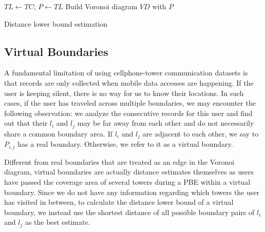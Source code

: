 \begin{algorithm}
 $TL \leftarrow TC$; $P \leftarrow TL$ \;
 Build Voronoi diagram $VD$ with $P$ \;
 \caption{Distance lower bound estimation}\label{alg:DLB_estimation}
\end{algorithm}


\subsection{Virtual Boundaries}

A fundamental limitation of using cellphone-tower communication datasets is that records are only collected when mobile data accesses are happening. If the user is keeping silent, there is no way for us to know their locations. In such cases, if the user has traveled across multiple boundaries, we may encounter the following observation: we analyze the consecutive records for this user and find out that their $l_i$ and $l_j$  may be far away from each other and do not necessarily share a common boundary area. If $l_i$ and $l_j$ are adjacent to each other, we say to $P_{i,j}$ has a real boundary. Otherwise, we refer to it as a virtual boundary.

Different from real boundaries that are treated as an edge in the Voronoi diagram, virtual boundaries are actually distance estimates themselves as users have passed the coverage area of several towers during a PBE within a virtual boundary. Since we do not have any information regarding which towers the user has visited in between, to calculate the distance lower bound of a virtual boundary, we instead use the shortest distance of all possible boundary pairs of $l_i$ and $l_j$ as the best estimate.

